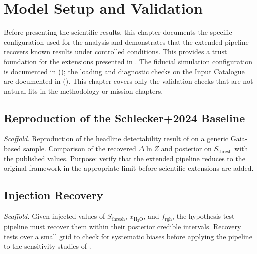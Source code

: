 \chapter{Model Setup and Validation}
\label{chap:setup_validation}

Before presenting the scientific results, this chapter documents the specific
configuration used for the analysis and demonstrates that the extended
pipeline recovers known results under controlled conditions.  This provides
a trust foundation for the extensions presented in .
The fiducial simulation configuration is documented in
 (); the loading and
diagnostic checks on the \PLATO Input Catalogue are documented in
 ().  This chapter
covers only the validation checks that are not natural fits in the
methodology or mission chapters.


\section{Reproduction of the Schlecker+2024 Baseline}
\label{sec:schlecker_reproduction}

\emph{Scaffold.}
Reproduction of the headline detectability result of \textcite{Schlecker2024}
on a generic Gaia-based sample. Comparison of the recovered
$\Delta \ln Z$ and posterior on $S_{\mathrm{thresh}}$ with the published
values. Purpose: verify that the extended pipeline reduces to the original
framework in the appropriate limit before scientific extensions are added.


\label{sec:age_validation}

\section{Injection Recovery}
\label{sec:injection_recovery}

\emph{Scaffold.}
Given injected values of $S_{\mathrm{thresh}}$, $x_{\mathrm{H_2O}}$, and
$f_{\mathrm{rgh}}$, the hypothesis-test pipeline must recover them within
their posterior credible intervals. Recovery tests over a small grid to
check for systematic biases before applying the pipeline to the sensitivity
studies of .
